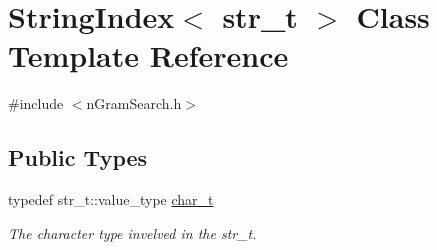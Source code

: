 \hypertarget{class_string_index}{}\section{String\+Index$<$ str\+\_\+t $>$ Class Template Reference}
\label{class_string_index}


{\ttfamily \#include $<$n\+Gram\+Search.\+h$>$}

\subsection*{Public Types}
\begin{DoxyCompactItemize}
\item 
\mbox{\label{class_string_index_a47f131c73d15a7c10c10a9748adf45dc}} 
typedef str\+\_\+t\+::value\+\_\+type \mbox{\hyperlink{class_string_index_a47f131c73d15a7c10c10a9748adf45dc}{char\+\_\+t}}
\begin{DoxyCompactList}\small\item\em The character type invelved in the str\+\_\+t. \end{DoxyCompactList}\end{DoxyCompactItemize}
